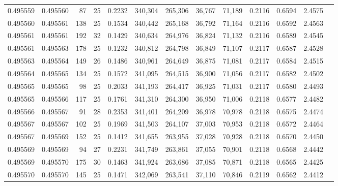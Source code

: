 \begin{tabular}{rrrrrrrrrrrrr}
0.495559 & 0.495560 &  87 &  25 &                                     0.2232 & 340,304 & 265,306 &  36,767 &  71,189 & 0.2116 & 0.6594 & 2.4575 \\
0.495560 & 0.495561 & 138 &  25 &                                     0.1534 & 340,442 & 265,168 &  36,792 &  71,164 & 0.2116 & 0.6592 & 2.4563 \\
0.495561 & 0.495561 & 192 &  32 &                                     0.1429 & 340,634 & 264,976 &  36,824 &  71,132 & 0.2116 & 0.6589 & 2.4545 \\
0.495561 & 0.495563 & 178 &  25 &                                     0.1232 & 340,812 & 264,798 &  36,849 &  71,107 & 0.2117 & 0.6587 & 2.4528 \\
0.495563 & 0.495564 & 149 &  26 &                                     0.1486 & 340,961 & 264,649 &  36,875 &  71,081 & 0.2117 & 0.6584 & 2.4515 \\
0.495564 & 0.495565 & 134 &  25 &                                     0.1572 & 341,095 & 264,515 &  36,900 &  71,056 & 0.2117 & 0.6582 & 2.4502 \\
0.495565 & 0.495565 &  98 &  25 &                                     0.2033 & 341,193 & 264,417 &  36,925 &  71,031 & 0.2117 & 0.6580 & 2.4493 \\
0.495565 & 0.495566 & 117 &  25 &                                     0.1761 & 341,310 & 264,300 &  36,950 &  71,006 & 0.2118 & 0.6577 & 2.4482 \\
0.495566 & 0.495567 &  91 &  28 &                                     0.2353 & 341,401 & 264,209 &  36,978 &  70,978 & 0.2118 & 0.6575 & 2.4474 \\
0.495567 & 0.495567 & 102 &  25 &                                     0.1969 & 341,503 & 264,107 &  37,003 &  70,953 & 0.2118 & 0.6572 & 2.4464 \\
0.495567 & 0.495569 & 152 &  25 &                                     0.1412 & 341,655 & 263,955 &  37,028 &  70,928 & 0.2118 & 0.6570 & 2.4450 \\
0.495569 & 0.495569 &  94 &  27 &                                     0.2231 & 341,749 & 263,861 &  37,055 &  70,901 & 0.2118 & 0.6568 & 2.4442 \\
0.495569 & 0.495570 & 175 &  30 &                                     0.1463 & 341,924 & 263,686 &  37,085 &  70,871 & 0.2118 & 0.6565 & 2.4425 \\
0.495570 & 0.495570 & 145 &  25 &                                     0.1471 & 342,069 & 263,541 &  37,110 &  70,846 & 0.2119 & 0.6562 & 2.4412 \\

\end{tabular}

